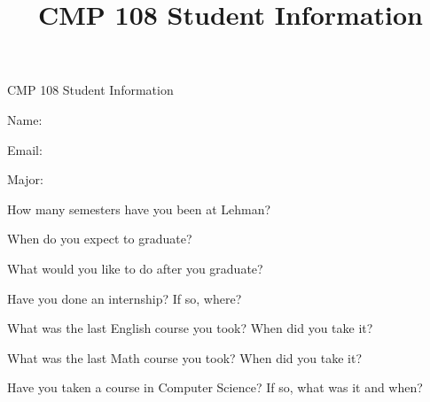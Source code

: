 \documentclass[11pt]{article}
\title{CMP 108 Student Information}
\begin{document}

\Large
\begin{center}
CMP 108 Student Information
\end{center}

\large
Name: \underline{\hspace{5in}}

Email: \underline{\hspace{5in}}

Major: \underline{\hspace{5in}}

How many semesters have you been at Lehman? \underline{\hspace{1in}}

When do you expect to graduate? \underline{\hspace{1in}}

What would you like to do after you graduate? 
\vspace{.5in}

Have you done an internship?  If so, where?
\vspace{.5in}

What was the last English course you took?  When did you take it?
\vspace{.5in}

What was the last Math course you took?  When did you take it?
\vspace{.5in}

Have you taken a course in Computer Science?  If so, what was it and when?


 
\end{document}
